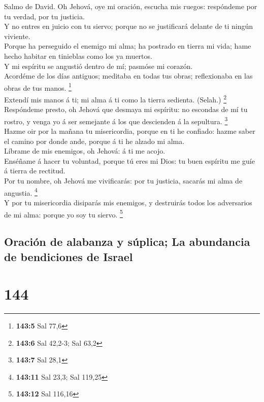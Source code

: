  Salmo de David. Oh Jehová, oye mi oración, escucha mis
ruegos: respóndeme por tu verdad, por tu justicia.\\
 Y no entres en juicio con tu siervo; porque no se
justificará delante de ti ningún viviente.\\
 Porque ha perseguido el enemigo mi alma; ha postrado en
tierra mi vida; hame hecho habitar en tinieblas como los ya muertos.\\
 Y mi espíritu se angustió dentro de mí; pasmóse mi
corazón.\\
 Acordéme de los días antiguos; meditaba en todas tus
obras; reflexionaba en las obras de tus manos. \footnote{\textbf{143:5}
  Sal 77,6}\\
 Extendí mis manos á ti; mi alma á ti como la tierra
sedienta. (Selah.) \footnote{\textbf{143:6} Sal 42,2-3; Sal 63,2}\\
 Respóndeme presto, oh Jehová que desmaya mi espíritu: no
escondas de mí tu rostro, y venga yo á ser semejante á los que
descienden á la sepultura. \footnote{\textbf{143:7} Sal 28,1}\\
 Hazme oir por la mañana tu misericordia, porque en ti he
confiado: hazme saber el camino por donde ande, porque á ti he alzado mi
alma.\\
 Líbrame de mis enemigos, oh Jehová: á ti me acojo.\\
 Enséñame á hacer tu voluntad, porque tú eres mi Dios: tu
buen espíritu me guíe á tierra de rectitud.\\
 Por tu nombre, oh Jehová me vivificarás: por tu
justicia, sacarás mi alma de angustia. \footnote{\textbf{143:11} Sal
  23,3; Sal 119,25}\\
 Y por tu misericordia disiparás mis enemigos, y
destruirás todos los adversarios de mi alma: porque yo soy tu siervo.
\footnote{\textbf{143:12} Sal 116,16}

\hypertarget{oraciuxf3n-de-alabanza-y-suxfaplica-la-abundancia-de-bendiciones-de-israel}{%
\subsection{Oración de alabanza y súplica; La abundancia de bendiciones
de
Israel}\label{oraciuxf3n-de-alabanza-y-suxfaplica-la-abundancia-de-bendiciones-de-israel}}

\hypertarget{section-143}{%
\section{144}\label{section-143}}

